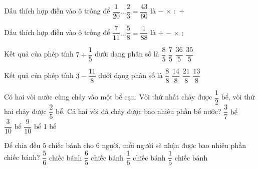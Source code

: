 \begin{ex} %
Dấu thích hợp điền vào ô trống để $\dfrac{1}{20} \dots \dfrac{2}{3} = \dfrac{43}{60}$ là
\choice
{$-$}
{$\times$}
{$:$}
{\True $+$}
\end{ex}

\begin{ex} %
Dấu thích hợp điền vào ô trống để $\dfrac{7}{11} \dots \dfrac{5}{8} = \dfrac{1}{88}$ là
\choice
{$+$}
{\True $-$}
{$\times$}
{$:$}
\end{ex}

\begin{ex} %
Kết quả của phép tính $7 + \dfrac{1}{5}$ dưới dạng phân số là
\choice
{$\dfrac{8}{5}$}
{$\dfrac{7}{5}$}
{\True $\dfrac{36}{5}$}
{$\dfrac{35}{5}$}
\end{ex}

\begin{ex} %
Kết quả của phép tính $3 - \dfrac{11}{8}$ dưới dạng phân số là
\choice
{$\dfrac{8}{8}$}
{$\dfrac{14}{8}$}
{$\dfrac{21}{8}$}
{\True $\dfrac{13}{8}$}
\end{ex}

\begin{ex} %
Có hai vòi nước cùng chảy vào một bể cạn. Vòi thứ nhất chảy được $\dfrac{1}{2}$ bể, vòi thứ hai chảy được $\dfrac{2}{5}$ bể. Cả hai vòi đã chảy được bao nhiêu phần bể nước?
\choice
{$\dfrac{3}{7}\text{ bể}$}
{$\dfrac{3}{10}\text{ bể}$}
{\True $\dfrac{9}{10}\text{ bể}$}
{$1\text{ bể}$}
\end{ex}

\begin{ex} %
Để chia đều $5$ chiếc bánh cho $6$ người, mỗi người sẽ nhận được bao nhiêu phần chiếc bánh?
\choice
{\True $\dfrac{5}{6}\text{ chiếc bánh}$}
{$\dfrac{6}{5}\text{ chiếc bánh}$}
{$\dfrac{1}{6}\text{ chiếc bánh}$}
{$\dfrac{1}{5}\text{ chiếc bánh}$}
\end{ex}

